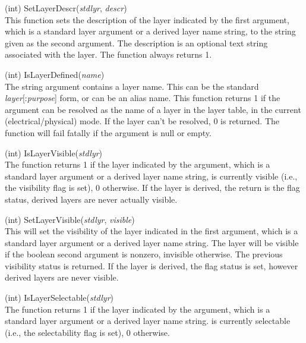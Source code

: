 \begin{description}
\item{(int) \vt SetLayerDescr({\it stdlyr\/}, {\it descr\/})}\\
This function sets the description of the layer indicated by the first
argument, which is a standard layer argument or a derived layer name
string, to the string given as the second argument.  The description
is an optional text string associated with the layer.  The function
always returns 1.

\item{(int) \vt IsLayerDefined({\it name\/})}\\
The string argument contains a layer name.  This can be the standard
{\it layer\/}[{\vt :}{\it purpose\/}] form, or can be an alias name. 
This function returns 1 if the argument can be resolved as the name of
a layer in the layer table, in the current (electrical/physical) mode. 
If the layer can't be resolved, 0 is returned.  The function will fail
fatally if the argument is null or empty.

\item{(int) \vt IsLayerVisible({\it stdlyr\/})}\\
The function returns 1 if the layer indicated by the argument, which
is a standard layer argument or a derived layer name string, is
currently visible (i.e., the visibility flag is set), 0 otherwise.  If
the layer is derived, the return is the flag status, derived layers
are never actually visible.

\item{(int) \vt SetLayerVisible({\it stdlyr\/}, {\it visible\/})}\\
This will set the visibility of the layer indicated in the first
argument, which is a standard layer argument or a derived layer name
string.  The layer will be visible if the boolean second argument is
nonzero, invisible otherwise.  The previous visibility status is
returned.  If the layer is derived, the flag status is set, however
derived layers are never visible.

\item{(int) \vt IsLayerSelectable({\it stdlyr\/})}\\
The function returns 1 if the layer indicated by the argument, which
is a standard layer argument or a derived layer name string.  is
currently selectable (i.e., the selectability flag is set), 0
otherwise.


\end{description}
